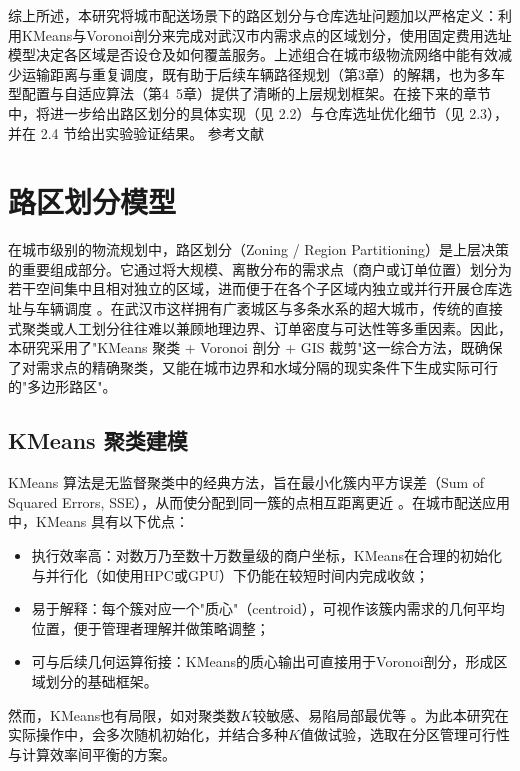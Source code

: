 \documentclass[12pt,a4paper,twoside]{ctexbook}
\begin{document}
综上所述，本研究将城市配送场景下的路区划分与仓库选址问题加以严格定义：利用KMeans与Voronoi剖分来完成对武汉市内需求点的区域划分，使用固定费用选址模型决定各区域是否设仓及如何覆盖服务。上述组合在城市级物流网络中能有效减少运输距离与重复调度，既有助于后续车辆路径规划（第3章）的解耦，也为多车型配置与自适应算法（第4~5章）提供了清晰的上层规划框架。在接下来的章节中，将进一步给出路区划分的具体实现（见 2.2）与仓库选址优化细节（见 2.3），并在 2.4 节给出实验验证结果。
参考文献

\section{路区划分模型}

在城市级别的物流规划中，路区划分（Zoning / Region Partitioning）是上层决策的重要组成部分。它通过将大规模、离散分布的需求点（商户或订单位置）划分为若干空间集中且相对独立的区域，进而便于在各个子区域内独立或并行开展仓库选址与车辆调度 \cite{Taniguchi2018}。在武汉市这样拥有广袤城区与多条水系的超大城市，传统的直接式聚类或人工划分往往难以兼顾地理边界、订单密度与可达性等多重因素。因此，本研究采用了"KMeans 聚类 + Voronoi 剖分 + GIS 裁剪"这一综合方法，既确保了对需求点的精确聚类，又能在城市边界和水域分隔的现实条件下生成实际可行的"多边形路区"。

\subsection{KMeans 聚类建模}

KMeans 算法是无监督聚类中的经典方法，旨在最小化簇内平方误差（Sum of Squared Errors, SSE），从而使分配到同一簇的点相互距离更近 \cite{Lloyd1982}。在城市配送应用中，KMeans 具有以下优点：

\begin{itemize}
    \item 执行效率高：对数万乃至数十万数量级的商户坐标，KMeans在合理的初始化与并行化（如使用HPC或GPU）下仍能在较短时间内完成收敛；
    \item 易于解释：每个簇对应一个"质心"（centroid），可视作该簇内需求的几何平均位置，便于管理者理解并做策略调整；
    \item 可与后续几何运算衔接：KMeans的质心输出可直接用于Voronoi剖分，形成区域划分的基础框架。
\end{itemize}

然而，KMeans也有局限，如对聚类数$K$较敏感、易陷局部最优等 \cite{Kaufman2009}。为此本研究在实际操作中，会多次随机初始化，并结合多种$K$值做试验，选取在分区管理可行性与计算效率间平衡的方案。
\end{document}
